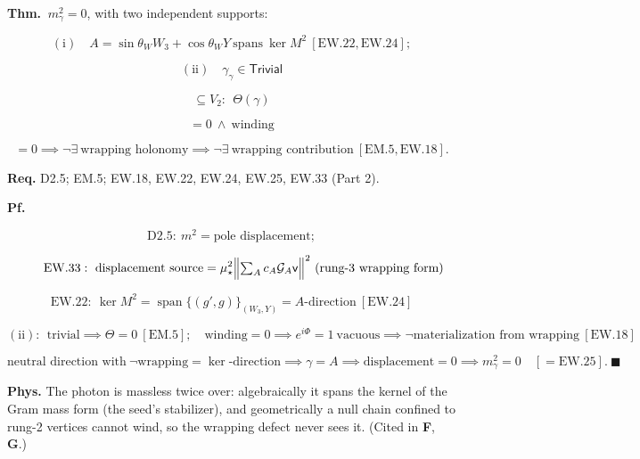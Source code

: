 \begin{theorem}\label{tag:EM-6}
\textbf{Thm.} $\ m_\gamma^2=0$, with two independent supports:

\[
(\mathrm{i})\quad A=\sin\theta_W W_3+\cos\theta_W Y\ \text{spans}\ \ker M^2\ [\mathrm{EW.22},\mathrm{EW.24}];
\]

\[
(\mathrm{ii})\quad\gamma_{\gamma}\in\mathsf{Trivial}
\]

\[
\subseteq V_2:\ \ \Theta(\gamma)
\]

\[
= 0\ \wedge\ \text{winding}
\]

\[
= 0\implies\neg\exists\ \text{wrapping holonomy}\implies\neg\exists\ \text{wrapping contribution}\ [\mathrm{EM.5},\mathrm{EW.18}].
\]

\textbf{Req.} D2.5; EM.5; EW.18, EW.22, EW.24, EW.25, EW.33 (Part 2).

\textbf{Pf.}

\[
\mathrm{D2.5}:\ m^2=\text{pole displacement};
\]

\[
\qquad \mathrm{EW.33}:\ \text{displacement source}=\mu_\star^2\Bigl\|\textstyle\sum_Ac_A\mathcal G_A\mathsf v\Bigr\|^2\ (\text{rung-3 wrapping form})
\]

\[
\mathrm{EW.22}:\ \ker M^2=\operatorname{span}\{(g',g)\}_{(W_3,Y)}=A\text{-direction}\ [\mathrm{EW.24}]
\]

\[
(\mathrm{ii}):\ \ \text{trivial}\implies\Theta=0\ [\mathrm{EM.5}];\quad\text{winding}=0\implies e^{i\Phi}=1\ \text{vacuous}\implies\neg\text{materialization from wrapping}\ [\mathrm{EW.18}]
\]

\[
\text{neutral direction with}\ \neg\text{wrapping}=\ker\text{-direction}\implies\gamma=A\implies\text{displacement}=0\implies m_\gamma^2=0\quad[=\mathrm{EW.25}].\ \blacksquare
\]

\textbf{Phys.} The photon is massless twice over: algebraically it spans the kernel of the Gram mass form (the seed’s stabilizer), and geometrically a null chain confined to rung-2 vertices cannot wind, so the wrapping defect never sees it. (Cited in \textbf{F}, \textbf{G}.)

\end{theorem}

